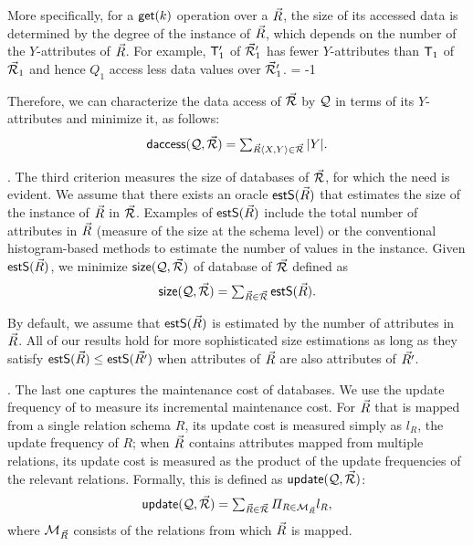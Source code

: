 \vspace{0.36ex}
More specifically,
for a $\protect\mathsf{get}(k)$ operation over a \bs $\vec{R}$, the size
of its accessed data is determined by the degree of the \baav
instance of $\vec{R}$, which depends on the number of the
$Y$-attributes of $\vec{R}$.
For example, $\protect\mathsf{T}_{1}'$ of $\vec{{\mathcal R}}_{1}'$ has fewer
$Y$-attributes than $\protect\mathsf{T}_{1}$ of $\vec{{\mathcal R}}_{1}$ and hence
$Q_{1}$ access less data values over $\vec{{\mathcal R}}_{1}'$.
\looseness = -1

\vspace{0.36ex}
Therefore, we can characterize the data access of
$\vec{{\mathcal R}}$ by $\mathcal Q$ in terms of its $Y$-attributes
and minimize it, as follows:
\vspace{-0.7ex}
\[
\textstyle \daccess(\Q, \kb{\R}) = \textstyle
\sum_{\kb{R}\bschema{X}{Y} \in \kb{\R}} |Y|.
\vspace{-1ex}\]


.
The third criterion measures
the size of \baav databases of $\vec{{\mathcal R}}$, for which the need
is evident.
We assume that there exists an oracle ${\mathsf{estS}}(\vec{R})$
that estimates the size of the \baav instance of \bs $\vec{R}$ in $\vec{{\mathcal R}}$.
Examples of ${\mathsf{estS}}(\vec{R})$ include
the total number of attributes in $\vec{R}$ (\ie measure of the
size at the schema level) or the conventional histogram-based
methods to estimate the number of values in the instance. Given
${\mathsf{estS}}(\vec{R})$, we minimize ${\mathsf{size}}(\mathcal Q, \vec{{\mathcal R}})$ of
\baav database of $\vec{{\mathcal R}}$ defined as
\vspace{-0.7ex}
\[\size(\Q,\kb{\R}) = \textstyle \sum_{\kb{R}\in
  \kb{\R}}\esize(\kb{R}).
\vspace{-0.7ex}\]

By default, we assume that ${\mathsf{estS}}(\vec{R})$ is estimated by the
number of attributes in $\vec{R}$. All of our results hold
for more sophisticated size estimations as long as they
satisfy ${\mathsf{estS}}(\vec{R}) \leq {\ensuremath {\mathsf{estS}}}(\vec{R'})$ when attributes of
$\vec{R}$ are also attributes of $\vec{R'}$.

.
The last one captures the maintenance cost of \baav databases.
We use the update frequency of \bss to measure its incremental
maintenance cost.
For \bs $\vec{R}$ that is mapped from a single relation schema
$R$, its update cost is measured simply as $l_{R}$, \ie the
update frequency of $R$; when $\vec{R}$ contains attributes mapped
from multiple relations, its update cost is measured as the
product of the update frequencies of the relevant relations.
Formally, this is defined as
${\mathsf{update}}(\mathcal Q, \vec{{\mathcal R}})$:
\vspace{-0.7ex}
\[\update(\Q,\kb{\R}) = \textstyle\sum_{\kb{R}\in \kb{\R}}\Pi_{R\in \Mc_{\kb{R}}}l_{R},
\vspace{-0.7ex}\]
where $\mathcal{M}_{\vec{R}}$ consists of the relations from which $\vec{R}$ is mapped. 

